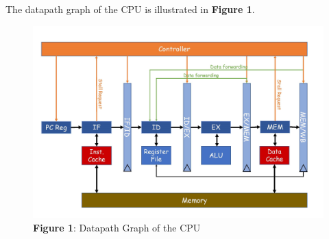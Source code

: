 \documentclass[UTF8, 12pt]{ctexart}
\begin{document}
            The datapath graph of the CPU is illustrated in \textbf{Figure 1}.
            \begin{figure}[h]
                \includegraphics[scale=0.4]{datapath_diagram_2.jpg}
                \centering
                \caption*{\textbf{Figure 1}: Datapath Graph of the CPU}
            \end{figure}
\end{document}
